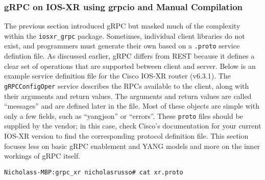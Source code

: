 \subsubsection{gRPC on IOS-XR using grpcio and Manual Compilation}
The previous section introduced gRPC but masked much of the complexity
within the \verb|iosxr_grpc| package. Sometimes, individual client libraries
do not exist, and programmers must generate their own based on a
\verb|.proto| service defintion file. As discussed earlier, gRPC
differs from REST because it defines a clear set of operations
that are supported between client and server. Below is an example
service definition file for the Cisco IOS-XR router (v6.3.1). The
\verb|gRPCConfigOper| service describes the RPCs available to the client,
along with their arguments and return values. The arguments and return
values are called ``messages'' and are defined later in the file. Most of
these objects are simple with only a few fields, such as ``yangjson'' or
``errors''. These \verb|proto| files should be supplied by the vendor;
in this case, check Cisco's documentation for your current IOS-XR version
to find the corresponding protocol definition file. This section focuses
less on basic gRPC enablement and YANG models and more on the
inner workings of gRPC itself.

\begin{verbatim}
Nicholass-MBP:grpc_xr nicholasrusso# cat xr.proto
\end{verbatim}

